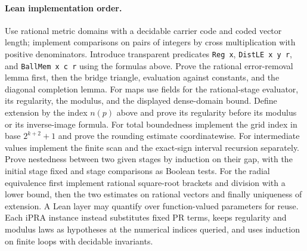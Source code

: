 \paragraph{Lean implementation order.}
Use rational metric domains with a decidable carrier code and coded vector
length; implement comparisons on pairs of integers by cross multiplication
with positive denominators. Introduce transparent predicates
\texttt{Reg x}, \texttt{DistLE x y r}, and \texttt{BallMem x c r} using
the formulas above. Prove the rational error-removal lemma first, then the
bridge triangle, evaluation against constants, and the diagonal completion
lemma. For maps use fields for the rational-stage evaluator, its regularity,
the modulus, and the displayed dense-domain bound. Define extension by the
index $n(p)$ above and prove its regularity before its modulus or its
inverse-image formula. For total boundedness implement the grid index in
base $2^{k+2}+1$ and prove the rounding estimate coordinatewise. For
intermediate values implement the finite scan and the exact-sign
interval recursion separately. Prove nestedness between two given stages
by induction on their gap, with the initial stage fixed and stage comparisons
as Boolean tests. For the radial equivalence first implement rational
square-root brackets and division with a lower bound, then the two estimates
on rational vectors and finally uniqueness of extension. A Lean layer
may quantify over function-valued parameters for reuse. Each iPRA instance
instead substitutes fixed PR terms, keeps regularity and modulus laws as
hypotheses at the numerical indices queried, and uses induction on finite
loops with decidable invariants.

